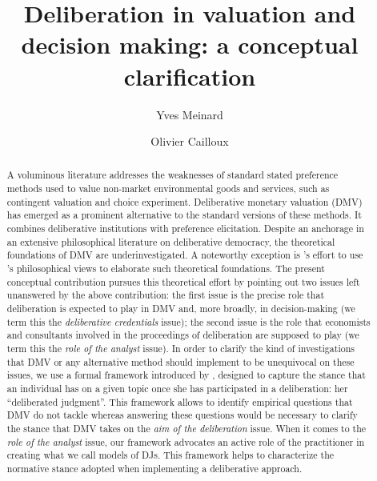 \documentclass[version=3.21, pagesize, twoside=off, bibliography=totoc, DIV=calc, fontsize=12pt, a4paper, french, english]{scrartcl}
\newcommand{\institute}[1]{}
\newcommand{\keywords}[1]{}
\begin{document}
\title{Deliberation in valuation and decision making: a conceptual clarification}
\author{Yves Meinard \and Olivier Cailloux}
\institute{
	Yves Meinard
	\and
	Olivier Cailloux 
	\at 
	Université Paris-Dauphine, \\
	PSL Research University, \\
	CNRS, \\
	LAMSADE\\
	75016 PARIS, FRANCE\\
	\email{olivier.cailloux@dauphine.fr}
}
\makeatletter
\makeatother
\maketitle

\keywords{decision aid, justification, empirical validation, methodology} 

\begin{abstract}
A voluminous literature addresses the weaknesses of standard stated preference methods used to value non-market environmental goods and services, such as contingent valuation and choice experiment. 
Deliberative monetary valuation (DMV) has emerged as a prominent alternative to the standard versions of these methods. It combines deliberative institutions with preference elicitation. 
Despite an anchorage in an extensive philosophical literature on deliberative democracy, the theoretical foundations of DMV are underinvestigated.  
A noteworthy exception is \citet{bartkowski_beyond_2018}’s effort to use \citeauthor{sen_idea_2009}’s philosophical views to elaborate such theoretical foundations. 
The present conceptual contribution pursues this theoretical effort by pointing out two issues left unanswered by the above contribution: 
the first issue is the precise role that deliberation is expected to play in DMV and, more broadly, in decision-making (we term this the \emph{deliberative credentials} issue); 
the second issue is the role that economists and consultants involved in the proceedings of deliberation are supposed to play (we term this the \emph{role of the analyst} issue). 
In order to clarify the kind of investigations that DMV or any alternative method should implement to be unequivocal on these issues, we use a formal framework introduced by \citet{cailloux_formal_2019}, designed to capture the stance that an individual has on a given topic once she has participated in a deliberation: her “deliberated judgment”. 
This framework allows to identify empirical questions that DMV do not tackle whereas answering these questions would be necessary to clarify the stance that DMV takes on the \emph{aim of the deliberation} issue. 
When it comes to the \emph{role of the analyst} issue, our framework advocates an active role of the practitioner in creating what we call models of \aclp{DJ}. 
This framework helps to characterize the normative stance adopted when implementing a deliberative approach.
\end{abstract}
\acresetall
\end{document}

